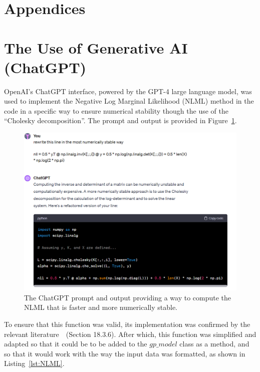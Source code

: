 \appendix
\section*{Appendices}
\renewcommand{\thelstlisting}{\thesection.\arabic{lstlisting}}
\setcounter{lstlisting}{0}
\section{The Use of Generative AI (ChatGPT)}
\label{app:GPT}
OpenAI's ChatGPT interface, powered by the GPT-4 large language model, was used to implement the Negative Log Marginal Likelihood (NLML) method in the code in a specific way to ensure numerical stability though the use of the ``Cholesky decomposition''.
The prompt and output is provided in Figure~\ref{fig:chat-NLML}.
\begin{figure}[htbp]
    \centering
    \includegraphics[width=1\linewidth]{figures/chat-NLML/chat-NLML.png}
    \caption{The ChatGPT prompt and output providing a way to compute the NLML that is faster and more numerically stable.}
    \label{fig:chat-NLML}
\end{figure}

\FloatBarrier

To ensure that this function was valid, its implementation was confirmed by the relevant literature~\cite{murphy2023probabilistic}~(Section 18.3.6).
After which, this function was simplified and adapted so that it could be to be added to the $gp\_model$ class as a method, and so that it would work with the way the input data was formatted, as shown in Listing~\ref{lst:NLML}.

